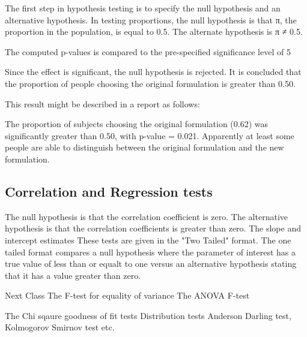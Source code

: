 The first step in hypothesis testing is to specify the null hypothesis and an alternative hypothesis. In testing proportions, the null hypothesis is that π, the proportion in the population, is equal to 0.5. The alternate hypothesis is π ≠ 0.5.
 
The computed p-values is compared to the pre-specified significance level of 5%
 
Since the effect is significant, the null hypothesis is rejected. It is concluded that the proportion of people choosing the original formulation is greater than 0.50.
 
This result might be described in a report as follows:
 
	The proportion of subjects choosing the original formulation (0.62) was significantly greater than 0.50, with p-value = 0.021. 
	Apparently at least some people are able to distinguish between the original formulation and the new formulation.
\subsection*{Correlation  and Regression tests}
The null hypothesis is that the correlation coefficient is zero.
The alternative hypothesis is that the correlation coefficients is greater than zero.
The slope and intercept estimates
These tests are given in the "Two Tailed" format.
The one tailed format compares a null hypothesis where the parameter of interest has a true value of less than or equalt to one
versus an alternative hypothesis stating that it has a value greater than zero.

 
Next Class
The F-test for equality of variance
The ANOVA F-test
 

The Chi sqaure goodness of fit tests
Distribution tests
	Anderson Darling test, Kolmogorov Smirnov test etc.
 
 
